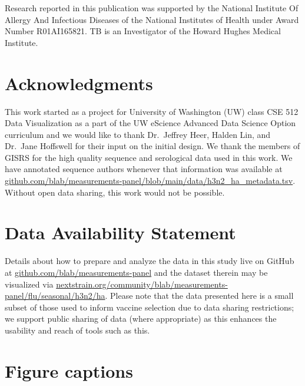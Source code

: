 \documentclass[utf8]{FrontiersinHarvard} %
\begin{document}
Research reported in this publication was supported by the National Institute Of Allergy And Infectious Diseases of the National Institutes of Health under Award Number R01AI165821.
TB is an Investigator of the Howard Hughes Medical Institute.

\section*{Acknowledgments}

This work started as a project for University of Washington (UW) class CSE 512 Data Visualization as a part of the UW eScience Advanced Data Science Option curriculum and we would like to thank Dr.\ Jeffrey Heer, Halden Lin, and Dr.\ Jane Hoffswell for their input on the initial design.
We thank the members of GISRS for the high quality sequence and serological data used in this work.
We have annotated sequence authors whenever that information was available at \href{https://github.com/blab/measurements-panel/blob/main/data/h3n2_ha_metadata.tsv}{github.com/blab/measurements-panel/blob/main/data/h3n2\_ha\_metadata.tsv}.
Without open data sharing, this work would not be possible.

\section*{Data Availability Statement}

Details about how to prepare and analyze the data in this study live on GitHub at \href{https://github.com/blab/measurements-panel/}{github.com/blab/measurements-panel} and the dataset therein may be visualized via \newline\href{https://nextstrain.org/community/blab/measurements-panel/flu/seasonal/h3n2/ha}{nextstrain.org/community/blab/measurements-panel/flu/seasonal/h3n2/ha}.
Please note that the data presented here is a small subset of those used to inform vaccine selection due to data sharing restrictions; we support public sharing of data (where appropriate) as this enhances the usability and reach of tools such as this.





\section*{Figure captions}
\end{document}
